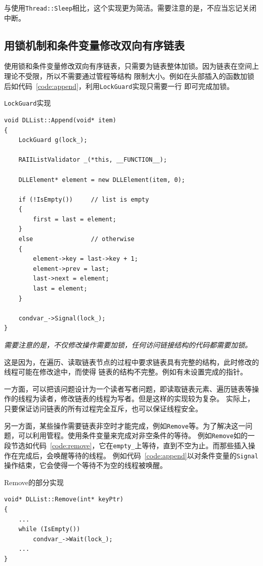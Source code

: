 \documentclass[a4paper,twoside]{article}
\begin{document}
\begin{spacing}{1.2}
与使用\texttt{Thread::Sleep}相比，这个实现更为简洁。需要注意的是，不应当忘记关闭中断。

\subsection{用锁机制和条件变量修改双向有序链表}

使用锁和条件变量修改双向有序链表，只需要为链表整体加锁。因为链表在空间上理论不受限，所以不需要通过管程等结构
限制大小。例如在头部插入的函数加锁后如代码~\ref{code:append}，利用\texttt{LockGuard}实现只需要一行
即可完成加锁。

\begin{listing}[htb]
	\caption{\texttt{LockGuard}实现}
	\label{code:append}
	\begin{verbatim}
void DLList::Append(void* item)
{
	LockGuard g(lock_);

	RAIIListValidator _(*this, __FUNCTION__);

	DLLElement* element = new DLLElement(item, 0);

	if (!IsEmpty())		// list is empty
	{
		first = last = element;
	}
	else				// otherwise
	{
		element->key = last->key + 1;
		element->prev = last;
		last->next = element;
		last = element;
	}

	condvar_->Signal(lock_);
}
	\end{verbatim}
\end{listing}

\emph{需要注意的是，不仅修改操作需要加锁，任何访问链接结构的代码都需要加锁。}

这是因为，在遍历、读取链表节点的过程中要求链表具有完整的结构，此时修改的线程可能在修改途中，而使得
链表的结构不完整。例如有未设置完成的指针。

一方面，可以把该问题设计为一个读者写者问题，即读取链表元素、遍历链表等操作的线程为读者，修改链表的线程为写者。但是这样的实现较为复杂。
实际上，只要保证访问链表的所有过程完全互斥，也可以保证线程安全。

另一方面，某些操作需要链表非空时才能完成，例如\texttt{Remove}等。为了解决这一问题，可以利用管程。使用条件变量来完成对非空条件的等待。
例如\texttt{Remove}如的一段节选如代码~\ref{code:remove}，它在\texttt{empty\_}上等待，直到不空为止。而那些插入操作在完成后，会唤醒等待的线程。
例如代码~\ref{code:append}以对条件变量的\texttt{Signal}操作结束，它会使得一个等待不为空的线程被唤醒。
\begin{listing}[H]
	\caption{Remove的部分实现}
	\label{code:remove}
	\begin{verbatim}
void* DLList::Remove(int* keyPtr)
{
	...
	while (IsEmpty())
		condvar_->Wait(lock_);	
	...
}
	\end{verbatim}
\end{listing}



\end{spacing}
\end{document}
